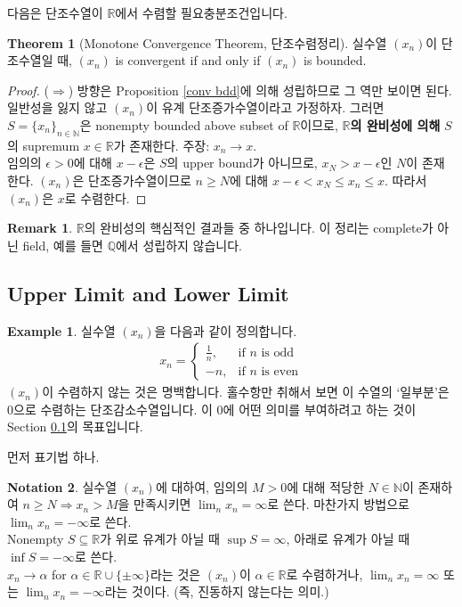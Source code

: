\documentclass[12pt]{article}
\theoremstyle{definition}
\newtheorem{thm}{Theorem}[section]
\newtheorem{notn}[thm]{Notation}
\newtheorem*{rem}{Remark}
\newtheorem*{ex}{Example}
\def\NN{\mathbb{N}}
\def\QQ{\mathbb{Q}}
\def\RR{\mathbb{R}}
\def\eps{\epsilon}
\begin{document}
다음은 단조수열이 \(\RR\)에서 수렴할 필요충분조건입니다.

	\begin{thm} [Monotone Convergence Theorem, 단조수렴정리]
		실수열 \((x_n)\)이 단조수열일 때, \((x_n)\) is convergent if and only if \((x_n)\) is bounded.
	\end{thm}
	\begin{proof}
		($\Rightarrow$) 방향은 Proposition \ref{conv bdd}에 의해 성립하므로 그 역만 보이면 된다. 일반성을 잃지 않고 \((x_n)\)이 유계 단조증가수열이라고 가정하자. 그러면 \(S = \{x_n\}_{n \in \NN}\)은 nonempty bounded above subset of \(\RR\)이므로, \textbf{\(\RR\)의 완비성에 의해} \(S\)의 supremum \(x \in \RR\)가 존재한다. 주장: \(x_n \rightarrow x\).\\
		임의의 \(\eps > 0\)에 대해 \(x - \eps\)은 \(S\)의 upper bound가 아니므로, \(x_N > x - \eps\)인 \(N\)이 존재한다. \((x_n)\)은 단조증가수열이므로 \(n \ge N\)에 대해 \(x - \eps < x_N \le x_n \le x\). 따라서 \((x_n)\)은 \(x\)로 수렴한다.
	\end{proof}
	\begin{rem}
		\(\RR\)의 완비성의 핵심적인 결과들 중 하나입니다. 이 정리는 complete가 아닌 field, 예를 들면 \(\QQ\)에서 성립하지 않습니다.
	\end{rem}

\subsection{Upper Limit and Lower Limit} \label{sec limsup}

	\begin{ex}
		실수열 \((x_n)\)을 다음과 같이 정의합니다.
		\begin{gather*}
			x_n = 
			\begin{cases}
				\frac{1}{n}, & \text{if } n \text{ is odd}\\
				-n, & \text{if } n \text{ is even}
			\end{cases}
		\end{gather*}
		\((x_n)\)이 수렴하지 않는 것은 명백합니다. 홀수항만 취해서 보면 이 수열의 `일부분'은 0으로 수렴하는 단조감소수열입니다. 이 0에 어떤 의미를 부여하려고 하는 것이 Section \ref{sec limsup}의 목표입니다.
	\end{ex}

먼저 표기법 하나.

	\begin{notn}
		실수열 \((x_n)\)에 대하여, 임의의 \(M > 0\)에 대해 적당한 \(N \in \NN\)이 존재하여 \(n \ge N \Rightarrow x_n > M\)을 만족시키면 \(\lim_n x_n = \infty\)로 쓴다. 마찬가지 방법으로 \(\lim_n x_n = -\infty\)로 쓴다.\\
		Nonempty \(S \subseteq \RR\)가 위로 유계가 아닐 때 \(\sup S = \infty\), 아래로 유계가 아닐 때 \(\inf S = -\infty\)로 쓴다.\\
		\(x_n \rightarrow \alpha\) for \(\alpha \in \RR \cup \{\pm \infty\}\)라는 것은 \((x_n)\)이 \(\alpha \in \RR\)로 수렴하거나, \(\lim_n x_n = \infty\) 또는 \(\lim_n x_n = -\infty\)라는 것이다. (즉, 진동하지 않는다는 의미.)
	\end{notn}
\end{document}

